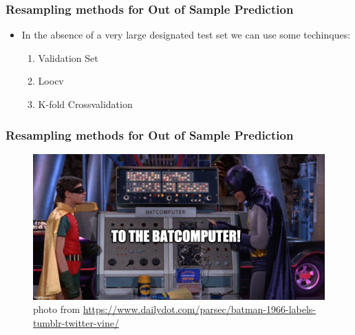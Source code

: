 \documentclass[
  shownotes,
  xcolor={svgnames},
  hyperref={colorlinks,citecolor=DarkBlue,linkcolor=andesred,urlcolor=DarkBlue}
  , aspectratio=169]{beamer}
\begin{document}
\begin{frame}
\frametitle{Resampling methods for Out of Sample Prediction}

\begin{itemize}
  \item In the absence of a very large designated test set we can use some techinques:
  \medskip
  \begin{enumerate}
    \item Validation Set
    \medskip
    \item Loocv
    \medskip
    \item K-fold Crossvalidation
  \end{enumerate}
\end{itemize}

\end{frame}
\begin{frame}
\frametitle{Resampling methods for Out of Sample Prediction}

\begin{figure}[H] \centering
  \centering
  \includegraphics[scale=0.35]{figures/baticomputer_meme.jpg}
  \\
  \tiny photo from \url{https://www.dailydot.com/parsec/batman-1966-labels-tumblr-twitter-vine/}
\end{figure}

\end{frame}
\end{document}

